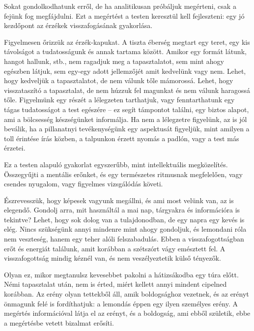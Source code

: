 
Sokat gondolkodhatunk erről, de ha analitikusan próbáljuk megérteni,
csak a fejünk fog megfájdulni. Ezt a megértést a testen keresztül kell
fejleszteni: egy jó kezdőpont az érzékek visszafogásának gyakorlása.

Figyelmesen őrizzük az érzék-kapukat. A tiszta éberség megtart egy
teret, egy kis távolságot a tudatosságunk és annak tartama között.
Amikor egy formát látunk, hangot hallunk, stb., nem ragadjuk meg a
tapasztalatot, sem mint ahogy egészben látjuk, sem egy-egy adott
jellemzőjét amit kedvelünk vagy nem. Lehet, hogy kedveljük a
tapasztalatot, de nem válunk tőle mámorossá. Lehet, hogy visszataszító a
tapasztalat, de nem húzzuk fel magunkat és nem válunk haragossá tőle.
Figyelmünk egy részét a lélegzeten tarthatjuk, vagy fenntarthatunk egy
tágas tudatosságot a test egészére -- ez segít támpontot találni, egy
biztos alapot, ami a bölcsesség készségünket informálja. Ha nem a
lélegzetre figyelünk, az is jól beválik, ha a pillanatnyi tevékenységünk
egy aspektusát figyeljük, mint amilyen a toll érintése írás közben, a
talpunkon érzett nyomás a padlón, vagy a test más érzetei.

Ez a testen alapuló gyakorlat egyszerűbb, mint intellektuális
megközelítés. Összegyűjti a mentális erőnket, és egy természetes
ritmusnak megfelelően, vagy csendes nyugalom, vagy figyelmes vizsgálódás
követi.

Észrevesszük, hogy képesek vagyunk megállni, és ami most velünk van, az
is elegendő. Gondolj arra, mit használtál a mai nap, tárgyakra és
információra is tekintve? Lehet, hogy sok dolog van a tulajdonodban, de
egy napra egy kevés is elég. Nincs szükségünk annyi mindenre mint ahogy
gondoljuk, és lemondani róla nem veszteség, hanem egy teher alóli
felszabadulás. Ebben a visszafogottságban erőt és energiát találunk,
amit korábban a szétszórt vágy emésztett fel. A visszafogottság mindig
kéznél van, és nem veszélyeztetik külső tényezők.

Olyan ez, mikor megtanulsz kevesebbet pakolni a hátizsákodba egy túra
előtt. Némi tapasztalat után, nem is érted, miért kellett annyi mindent
cipelned korábban. Az erény olyan tettekből áll, amik boldogsághoz
vezetnek, és az erényt önmagunk felé is fordíthatjuk: a lemondás éppen
egy ilyen személyes erény. A megértés információval látja el az erényt,
és a boldogság, ami ebből születik, ebbe a megértésbe vetett bizalmat
erősíti.


